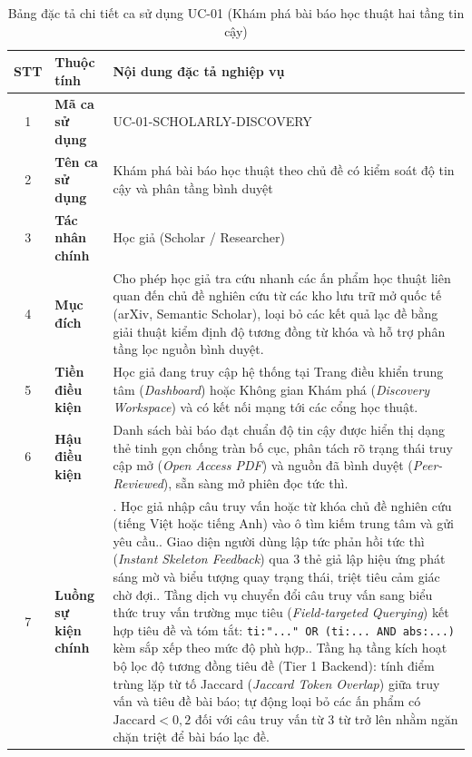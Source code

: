 \begin{table}[htbp]
\centering
\singlespacing
\footnotesize
\renewcommand{\arraystretch}{1.12}
\caption{Bảng đặc tả chi tiết ca sử dụng UC-01 (Khám phá bài báo học thuật hai tầng tin cậy)}
\label{tab:uc_01_spec}
\setlength{\tabcolsep}{4pt}
\begin{tabular}{|c|>{\raggedright\arraybackslash}p{2.6cm}|>{\raggedright\arraybackslash}p{10.2cm}|}
\hline
\textbf{STT} & \centering\textbf{Thuộc tính} & \centering\textbf{Nội dung đặc tả nghiệp vụ} \tabularnewline \hline
1 & \textbf{Mã ca sử dụng} & UC-01-SCHOLARLY-DISCOVERY \\ \hline
2 & \textbf{Tên ca sử dụng} & Khám phá bài báo học thuật theo chủ đề có kiểm soát độ tin cậy và phân tầng bình duyệt \\ \hline
3 & \textbf{Tác nhân chính} & Học giả (Scholar / Researcher) \\ \hline
4 & \textbf{Mục đích} & Cho phép học giả tra cứu nhanh các ấn phẩm học thuật liên quan đến chủ đề nghiên cứu từ các kho lưu trữ mở quốc tế (arXiv, Semantic Scholar), loại bỏ các kết quả lạc đề bằng giải thuật kiểm định độ tương đồng từ khóa và hỗ trợ phân tầng lọc nguồn bình duyệt. \\ \hline
5 & \textbf{Tiền điều kiện} & Học giả đang truy cập hệ thống tại Trang điều khiển trung tâm (\textit{Dashboard}) hoặc Không gian Khám phá (\textit{Discovery Workspace}) và có kết nối mạng tới các cổng học thuật. \\ \hline
6 & \textbf{Hậu điều kiện} & Danh sách bài báo đạt chuẩn độ tin cậy được hiển thị dạng thẻ tinh gọn chống tràn bố cục, phân tách rõ trạng thái truy cập mở (\textit{Open Access PDF}) và nguồn đã bình duyệt (\textit{Peer-Reviewed}), sẵn sàng mở phiên đọc tức thì. \\ \hline
7 & \textbf{Luồng sự kiện chính} & 
1. Học giả nhập câu truy vấn hoặc từ khóa chủ đề nghiên cứu (tiếng Việt hoặc tiếng Anh) vào ô tìm kiếm trung tâm và gửi yêu cầu.\newline
2. Giao diện người dùng lập tức phản hồi tức thì (\textit{Instant Skeleton Feedback}) qua 3 thẻ giả lập hiệu ứng phát sáng mờ và biểu tượng quay trạng thái, triệt tiêu cảm giác chờ đợi.\newline
3. Tầng dịch vụ chuyển đổi câu truy vấn sang biểu thức truy vấn trường mục tiêu (\textit{Field-targeted Querying}) kết hợp tiêu đề và tóm tắt: \texttt{ti:"..." OR (ti:... AND abs:...)} kèm sắp xếp theo mức độ phù hợp.\newline
4. Tầng hạ tầng kích hoạt bộ lọc độ tương đồng tiêu đề (Tier 1 Backend): tính điểm trùng lặp từ tố Jaccard (\textit{Jaccard Token Overlap}) giữa truy vấn và tiêu đề bài báo; tự động loại bỏ các ấn phẩm có $\text{Jaccard} < 0{,}2$ đối với câu truy vấn từ 3 từ trở lên nhằm ngăn chặn triệt để bài báo lạc đề.\newline

\end{tabular}
\end{table}

